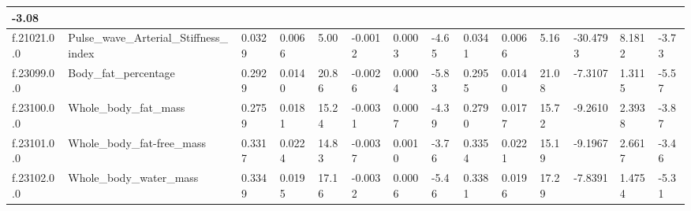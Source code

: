 \begin{longtable}{llllllllllllll}
  \multicolumn{1}{l|}{-3.08} \\ \hline
\multicolumn{1}{|l|}{f.21021.0.0} &
  \multicolumn{1}{l|}{Pulse\_wave\_Arterial\_Stiffness\_index} &
  \multicolumn{1}{l|}{0.0329} &
  \multicolumn{1}{l|}{0.0066} &
  \multicolumn{1}{l|}{5.00} &
  \multicolumn{1}{l|}{-0.0012} &
  \multicolumn{1}{l|}{0.0003} &
  \multicolumn{1}{l|}{-4.65} &
  \multicolumn{1}{l|}{0.0341} &
  \multicolumn{1}{l|}{0.0066} &
  \multicolumn{1}{l|}{5.16} &
  \multicolumn{1}{l|}{-30.4793} &
  \multicolumn{1}{l|}{8.1812} &
  \multicolumn{1}{l|}{-3.73} \\ \hline
\multicolumn{1}{|l|}{f.23099.0.0} &
  \multicolumn{1}{l|}{Body\_fat\_percentage} &
  \multicolumn{1}{l|}{0.2929} &
  \multicolumn{1}{l|}{0.0140} &
  \multicolumn{1}{l|}{20.86} &
  \multicolumn{1}{l|}{-0.0026} &
  \multicolumn{1}{l|}{0.0004} &
  \multicolumn{1}{l|}{-5.83} &
  \multicolumn{1}{l|}{0.2955} &
  \multicolumn{1}{l|}{0.0140} &
  \multicolumn{1}{l|}{21.08} &
  \multicolumn{1}{l|}{-7.3107} &
  \multicolumn{1}{l|}{1.3115} &
  \multicolumn{1}{l|}{-5.57} \\ \hline
\multicolumn{1}{|l|}{f.23100.0.0} &
  \multicolumn{1}{l|}{Whole\_body\_fat\_mass} &
  \multicolumn{1}{l|}{0.2759} &
  \multicolumn{1}{l|}{0.0181} &
  \multicolumn{1}{l|}{15.24} &
  \multicolumn{1}{l|}{-0.0031} &
  \multicolumn{1}{l|}{0.0007} &
  \multicolumn{1}{l|}{-4.39} &
  \multicolumn{1}{l|}{0.2790} &
  \multicolumn{1}{l|}{0.0177} &
  \multicolumn{1}{l|}{15.72} &
  \multicolumn{1}{l|}{-9.2610} &
  \multicolumn{1}{l|}{2.3938} &
  \multicolumn{1}{l|}{-3.87} \\ \hline
\multicolumn{1}{|l|}{f.23101.0.0} &
  \multicolumn{1}{l|}{Whole\_body\_fat-free\_mass} &
  \multicolumn{1}{l|}{0.3317} &
  \multicolumn{1}{l|}{0.0224} &
  \multicolumn{1}{l|}{14.83} &
  \multicolumn{1}{l|}{-0.0037} &
  \multicolumn{1}{l|}{0.0010} &
  \multicolumn{1}{l|}{-3.76} &
  \multicolumn{1}{l|}{0.3354} &
  \multicolumn{1}{l|}{0.0221} &
  \multicolumn{1}{l|}{15.19} &
  \multicolumn{1}{l|}{-9.1967} &
  \multicolumn{1}{l|}{2.6617} &
  \multicolumn{1}{l|}{-3.46} \\ \hline
\multicolumn{1}{|l|}{f.23102.0.0} &
  \multicolumn{1}{l|}{Whole\_body\_water\_mass} &
  \multicolumn{1}{l|}{0.3349} &
  \multicolumn{1}{l|}{0.0195} &
  \multicolumn{1}{l|}{17.16} &
  \multicolumn{1}{l|}{-0.0032} &
  \multicolumn{1}{l|}{0.0006} &
  \multicolumn{1}{l|}{-5.46} &
  \multicolumn{1}{l|}{0.3381} &
  \multicolumn{1}{l|}{0.0196} &
  \multicolumn{1}{l|}{17.29} &
  \multicolumn{1}{l|}{-7.8391} &
  \multicolumn{1}{l|}{1.4754} &
  \multicolumn{1}{l|}{-5.31} \\ \hline

\end{longtable}
